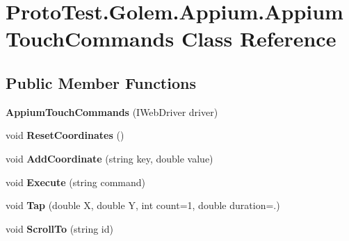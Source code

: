 \hypertarget{class_proto_test_1_1_golem_1_1_appium_1_1_appium_touch_commands}{\section{Proto\-Test.\-Golem.\-Appium.\-Appium\-Touch\-Commands Class Reference}
\label{class_proto_test_1_1_golem_1_1_appium_1_1_appium_touch_commands}
}
\subsection*{Public Member Functions}
\begin{DoxyCompactItemize}
\item 
\hypertarget{class_proto_test_1_1_golem_1_1_appium_1_1_appium_touch_commands_ae988c824bafeb4fa7b159cbfeaee86c5}{{\bfseries Appium\-Touch\-Commands} (I\-Web\-Driver driver)}\label{class_proto_test_1_1_golem_1_1_appium_1_1_appium_touch_commands_ae988c824bafeb4fa7b159cbfeaee86c5}

\item 
\hypertarget{class_proto_test_1_1_golem_1_1_appium_1_1_appium_touch_commands_a5dcb0751ae3f1f4e8230f10068e84886}{void {\bfseries Reset\-Coordinates} ()}\label{class_proto_test_1_1_golem_1_1_appium_1_1_appium_touch_commands_a5dcb0751ae3f1f4e8230f10068e84886}

\item 
\hypertarget{class_proto_test_1_1_golem_1_1_appium_1_1_appium_touch_commands_a4f531c59a9d9c0ced63ab9718c44d46e}{void {\bfseries Add\-Coordinate} (string key, double value)}\label{class_proto_test_1_1_golem_1_1_appium_1_1_appium_touch_commands_a4f531c59a9d9c0ced63ab9718c44d46e}

\item 
\hypertarget{class_proto_test_1_1_golem_1_1_appium_1_1_appium_touch_commands_a0077bd0c37c30cde0ee7798358a87a36}{void {\bfseries Execute} (string command)}\label{class_proto_test_1_1_golem_1_1_appium_1_1_appium_touch_commands_a0077bd0c37c30cde0ee7798358a87a36}

\item 
\hypertarget{class_proto_test_1_1_golem_1_1_appium_1_1_appium_touch_commands_ae9fe6e59ca58d05d08a9fa9f41d412b5}{void {\bfseries Tap} (double X, double Y, int count=1, double duration=.)}\label{class_proto_test_1_1_golem_1_1_appium_1_1_appium_touch_commands_ae9fe6e59ca58d05d08a9fa9f41d412b5}

\item 
\hypertarget{class_proto_test_1_1_golem_1_1_appium_1_1_appium_touch_commands_a2fb1dcd26a13d1877e54c33d56e292fd}{void {\bfseries Scroll\-To} (string id)}\label{class_proto_test_1_1_golem_1_1_appium_1_1_appium_touch_commands_a2fb1dcd26a13d1877e54c33d56e292fd}


\end{DoxyCompactItemize}
